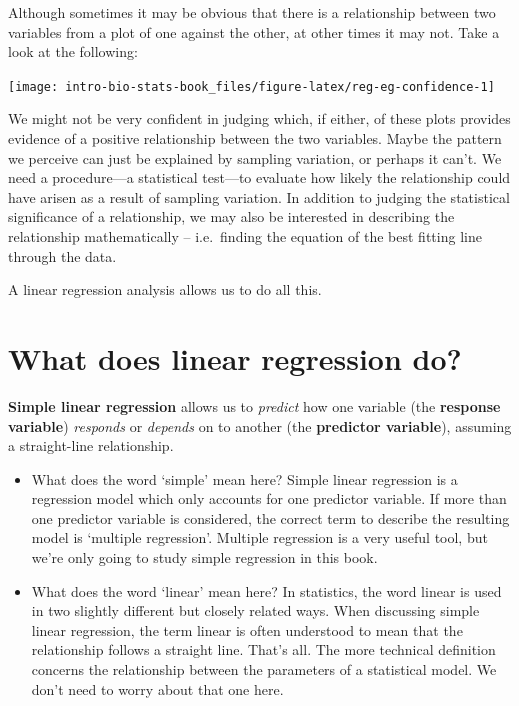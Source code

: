 \documentclass[
]{book}
\begin{document}
Although sometimes it may be obvious that there is a relationship between two variables from a plot of one against the other, at other times it may not. Take a look at the following:

\begin{center}\texttt{[image: intro-bio-stats-book\_files/figure-latex/reg-eg-confidence-1]} \end{center}

We might not be very confident in judging which, if either, of these plots provides evidence of a positive relationship between the two variables. Maybe the pattern we perceive can just be explained by sampling variation, or perhaps it can't. We need a procedure---a statistical test---to evaluate how likely the relationship could have arisen as a result of sampling variation. In addition to judging the statistical significance of a relationship, we may also be interested in describing the relationship mathematically -- i.e.~finding the equation of the best fitting line through the data.

A linear regression analysis allows us to do all this.

\hypertarget{what-does-linear-regression-do}{%
\section{What does linear regression do?}\label{what-does-linear-regression-do}}

\textbf{Simple linear regression} allows us to \emph{predict} how one variable (the \textbf{response variable}) \emph{responds} or \emph{depends} on to another (the \textbf{predictor variable}), assuming a straight-line relationship.

\begin{itemize}
\item
  What does the word `simple' mean here? Simple linear regression is a regression model which only accounts for one predictor variable. If more than one predictor variable is considered, the correct term to describe the resulting model is `multiple regression'. Multiple regression is a very useful tool, but we're only going to study simple regression in this book.
\item
  What does the word `linear' mean here? In statistics, the word linear is used in two slightly different but closely related ways. When discussing simple linear regression, the term linear is often understood to mean that the relationship follows a straight line. That's all. The more technical definition concerns the relationship between the parameters of a statistical model. We don't need to worry about that one here.
\end{itemize}
\end{document}
